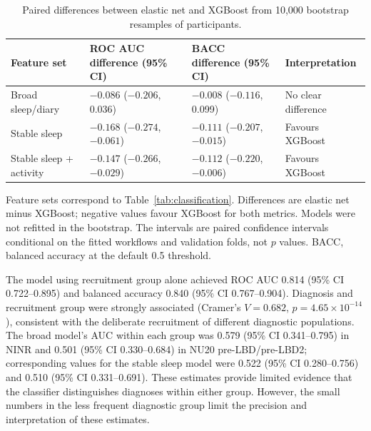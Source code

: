 \documentclass[referee,pdflatex,sn-vancouver-num]{sn-jnl}
\begin{document}
\begin{table}[t]
\caption{Paired differences between elastic net and XGBoost from 10,000 bootstrap resamples of participants.}
\label{tab:paired-model-comparison}
\centering
\footnotesize
\setlength{\tabcolsep}{4pt}
\begin{tabular}{@{}p{}>{\centering\arraybackslash}p{}>{\centering\arraybackslash}p{}>{\raggedright\arraybackslash}p{}@{}}
\toprule
Feature set & ROC AUC difference (95\% CI) & BACC difference (95\% CI) & Interpretation \\
\midrule
Broad sleep/diary & $-0.086$ ($-0.206$, 0.036) & $-0.008$ ($-0.116$, 0.099) & No clear difference \\
Stable sleep & $-0.168$ ($-0.274$, $-0.061$) & $-0.111$ ($-0.207$, $-0.015$) & Favours XGBoost \\
Stable sleep + activity & $-0.147$ ($-0.266$, $-0.029$) & $-0.112$ ($-0.220$, $-0.006$) & Favours XGBoost \\
\bottomrule
\end{tabular}

\medskip
\begin{minipage}{0.96\textwidth}\footnotesize
Feature sets correspond to Table~\ref{tab:classification}. Differences
are elastic net minus XGBoost; negative values favour XGBoost for both metrics.
Models were not refitted in the bootstrap. The intervals are
paired confidence intervals conditional on the fitted workflows and validation
folds, not $p$ values. BACC, balanced accuracy at the default 0.5 threshold.
\end{minipage}
\end{table}

The model using recruitment group alone achieved ROC AUC 0.814 (95\% CI
0.722--0.895) and balanced accuracy 0.840 (95\% CI 0.767--0.904). Diagnosis and
recruitment group were strongly associated (Cramer's
$V=0.682$, $p=4.65\times10^{-14}$), consistent with the deliberate recruitment
of different diagnostic populations. The broad model's AUC within each group was
0.579 (95\% CI 0.341--0.795) in NINR and 0.501 (95\% CI 0.330--0.684) in NU20
pre-LBD/pre-LBD2; corresponding values for the stable sleep model were 0.522
(95\% CI 0.280--0.756) and 0.510 (95\% CI 0.331--0.691). These estimates provide limited
evidence that the classifier distinguishes diagnoses within either group.
However, the small numbers in the less frequent diagnostic group limit the
precision and interpretation of these estimates.
\end{document}
